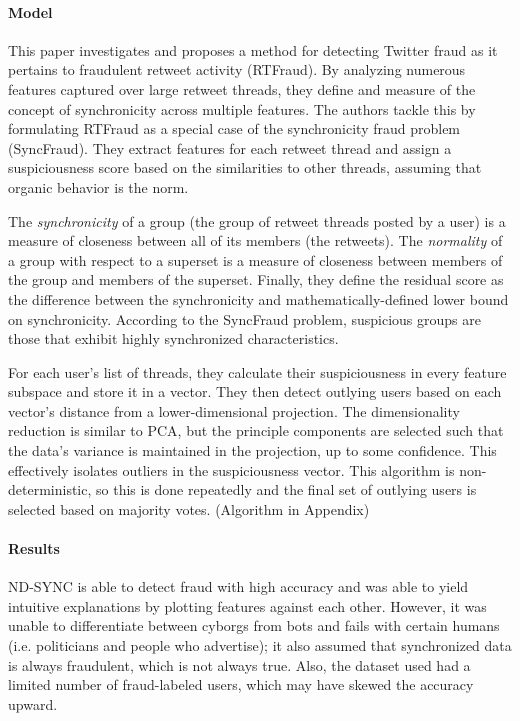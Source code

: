 \documentclass[11pt, oneside]{article}   	%
\begin{document}
\paragraph{Model}
\quad

\quad This paper investigates and proposes a method for detecting Twitter fraud
as it pertains to fraudulent retweet activity (RTFraud).  By analyzing numerous
features captured over large retweet threads, they define and measure of the
concept of synchronicity across multiple features.  The authors tackle this by
formulating RTFraud as a special case of the synchronicity fraud problem
(SyncFraud).  They extract features for each retweet thread and assign a
suspiciousness score based on the similarities to other threads, assuming that
organic behavior is the norm.

\quad The \textit{synchronicity} of a group (the group of retweet threads posted
by a user) is a measure of closeness between all of its members (the retweets).
The \textit{normality} of a group with respect to a superset is a measure of
closeness between members of the group and members of the superset.  Finally,
they define the residual score as the difference between the synchronicity and
mathematically-defined lower bound on synchronicity.  According to the SyncFraud
problem, suspicious groups are those that exhibit highly synchronized
characteristics.

\quad For each user's list of threads, they calculate their suspiciousness in
every feature subspace and store it in a vector. They then detect outlying users
based on each vector's distance from a lower-dimensional projection. The
dimensionality reduction is similar to PCA, but the principle components are
selected such that the data's variance is maintained in the projection, up to
some confidence. This effectively isolates outliers in the suspiciousness
vector. This algorithm is non-deterministic, so this is done repeatedly and the
final set of outlying users is selected based on majority votes. (Algorithm in Appendix)

\paragraph{Results}
\quad

\quad ND-SYNC is able to detect fraud with high accuracy and was able to yield
intuitive explanations by plotting features against each other.  However, it was
unable to differentiate between cyborgs from bots and fails with certain humans
(i.e. politicians and people who advertise); it also assumed that synchronized
data is always fraudulent, which is not always true.  Also, the dataset used had
a limited number of fraud-labeled users, which may have skewed the accuracy
upward.
\end{document}
